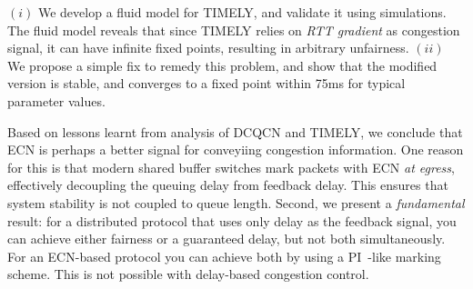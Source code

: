  $(i)$ We develop a fluid model for TIMELY, and validate it using
simulations. The fluid model reveals that since TIMELY relies on {\em RTT
gradient} as congestion signal, it can have infinite fixed points, resulting in
arbitrary unfairness.  $(ii)$ We propose a simple fix to remedy this problem,
and show that the modified version is stable, and converges to a fixed point
within 75ms for typical parameter values.

 Based on lessons learnt from analysis of DCQCN and TIMELY,
we conclude that ECN is perhaps a better signal for conveyiing congestion
information. One reason for this is that modern shared buffer switches mark
packets with ECN {\em at egress}, effectively decoupling the queuing delay from
feedback delay. This ensures that system stability is not coupled to queue
length. Second, we present a \emph{fundamental} result: for a distributed
protocol that uses only delay as the feedback signal, you can achieve either
fairness or a guaranteed delay, but not both simultaneously. For an ECN-based
protocol you can achieve both by using a
PI~\cite{hollot2001designing}-like marking scheme. This is not possible with
delay-based congestion control.



